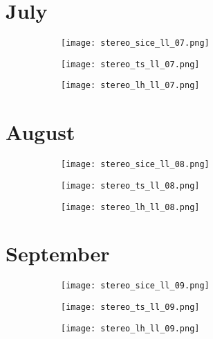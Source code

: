 \documentclass[preview]{standalone}
\begin{document}
\section*{July}
\begin{figure}
  \begin{subfigure}[t]{0.329\textwidth}
    \texttt{[image: stereo\_sice\_ll\_07.png]}
  \end{subfigure}
  \begin{subfigure}[t]{0.329\textwidth}
    \texttt{[image: stereo\_ts\_ll\_07.png]}
  \end{subfigure}
  \begin{subfigure}[t]{0.329\textwidth}
    \texttt{[image: stereo\_lh\_ll\_07.png]}
  \end{subfigure}
\end{figure}

\section*{August}
\begin{figure}
  \begin{subfigure}[t]{0.329\textwidth}
    \texttt{[image: stereo\_sice\_ll\_08.png]}
  \end{subfigure}
  \begin{subfigure}[t]{0.329\textwidth}
    \texttt{[image: stereo\_ts\_ll\_08.png]}
  \end{subfigure}
  \begin{subfigure}[t]{0.329\textwidth}
    \texttt{[image: stereo\_lh\_ll\_08.png]}
  \end{subfigure}
\end{figure}

\section*{September}
\begin{figure}
  \begin{subfigure}[t]{0.329\textwidth}
    \texttt{[image: stereo\_sice\_ll\_09.png]}
  \end{subfigure}
  \begin{subfigure}[t]{0.329\textwidth}
    \texttt{[image: stereo\_ts\_ll\_09.png]}
  \end{subfigure}
  \begin{subfigure}[t]{0.329\textwidth}
    \texttt{[image: stereo\_lh\_ll\_09.png]}
  \end{subfigure}
\end{figure}
\end{document}

